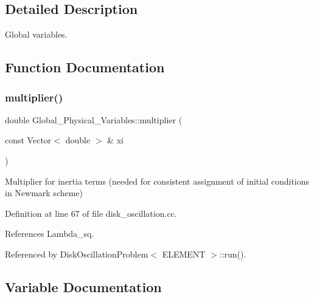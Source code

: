 \subsection{Detailed Description}
Global variables. 

\subsection{Function Documentation}
\mbox{\label{namespaceGlobal__Physical__Variables_a01099bce3441c7fe79ac6926800097a8}} 
\subsubsection{\texorpdfstring{multiplier()}{multiplier()}}
{\footnotesize\ttfamily double Global\+\_\+\+Physical\+\_\+\+Variables\+::multiplier (\begin{DoxyParamCaption}\item[{const Vector$<$ double $>$ \&}]{xi }\end{DoxyParamCaption})}



Multiplier for inertia terms (needed for consistent assignment of initial conditions in Newmark scheme) 



Definition at line 67 of file disk\+\_\+oscillation.\+cc.



References Lambda\+\_\+sq.



Referenced by Disk\+Oscillation\+Problem$<$ E\+L\+E\+M\+E\+N\+T $>$\+::run().



\subsection{Variable Documentation}
\mbox{\label{namespaceGlobal__Physical__Variables_a2a37fb040c832ee7a086bb13bb02a100}} 
